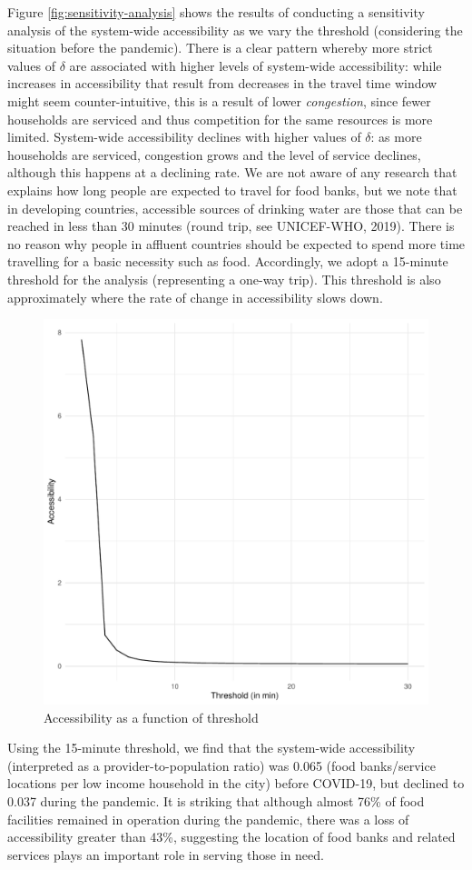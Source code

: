 \documentclass[]{elsarticle} %
\begin{document}
Figure \ref{fig:sensitivity-analysis} shows the results of conducting a
sensitivity analysis of the system-wide accessibility as we vary the
threshold (considering the situation before the pandemic). There is a
clear pattern whereby more strict values of \(\delta\) are associated
with higher levels of system-wide accessibility: while increases in
accessibility that result from decreases in the travel time window might
seem counter-intuitive, this is a result of lower \emph{congestion},
since fewer households are serviced and thus competition for the same
resources is more limited. System-wide accessibility declines with
higher values of \(\delta\): as more households are serviced, congestion
grows and the level of service declines, although this happens at a
declining rate. We are not aware of any research that explains how long
people are expected to travel for food banks, but we note that in
developing countries, accessible sources of drinking water are those
that can be reached in less than 30 minutes (round trip, see UNICEF-WHO,
2019). There is no reason why people in affluent countries should be
expected to spend more time travelling for a basic necessity such as
food. Accordingly, we adopt a 15-minute threshold for the analysis
(representing a one-way trip). This threshold is also approximately
where the rate of change in accessibility slows down.

\begin{figure}
\includegraphics[width=0.6\linewidth]{Accessibility-Foodbanks-Hamilton-V0_files/figure-latex/plot-results-sensitivity-analysis-1} \caption{\label{fig:sensitivity-analysis}Accessibility as a function of threshold}\label{fig:plot-results-sensitivity-analysis}
\end{figure}

Using the 15-minute threshold, we find that the system-wide
accessibility (interpreted as a provider-to-population ratio) was 0.065
(food banks/service locations per low income household in the city)
before COVID-19, but declined to 0.037 during the pandemic. It is
striking that although almost 76\% of food facilities remained in
operation during the pandemic, there was a loss of accessibility greater
than 43\%, suggesting the location of food banks and related services
plays an important role in serving those in need.
\end{document}
